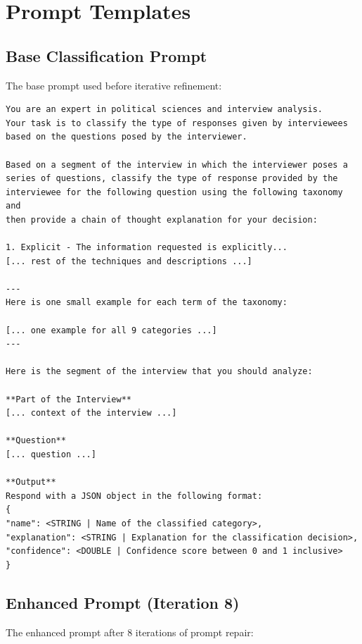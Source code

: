 \documentclass[11pt]{article}
\begin{document}
\section{Prompt Templates}
\label{sec:appendix-prompts}

\subsection{Base Classification Prompt}
\label{sec:appendix-base-prompt}

The base prompt used before iterative refinement:

\begin{lstlisting}[style=yaml]
You are an expert in political sciences and interview analysis.
Your task is to classify the type of responses given by interviewees
based on the questions posed by the interviewer.

Based on a segment of the interview in which the interviewer poses a
series of questions, classify the type of response provided by the
interviewee for the following question using the following taxonomy and
then provide a chain of thought explanation for your decision:

1. Explicit - The information requested is explicitly...
[... rest of the techniques and descriptions ...]

---
Here is one small example for each term of the taxonomy:

[... one example for all 9 categories ...]
---

Here is the segment of the interview that you should analyze:

**Part of the Interview**
[... context of the interview ...]

**Question**
[... question ...]

**Output**
Respond with a JSON object in the following format:
{
"name": <STRING | Name of the classified category>,
"explanation": <STRING | Explanation for the classification decision>,
"confidence": <DOUBLE | Confidence score between 0 and 1 inclusive>
}
\end{lstlisting}

\subsection{Enhanced Prompt (Iteration 8)}
\label{sec:appendix-enhanced-prompt}

The enhanced prompt after 8 iterations of prompt repair:
\end{document}
